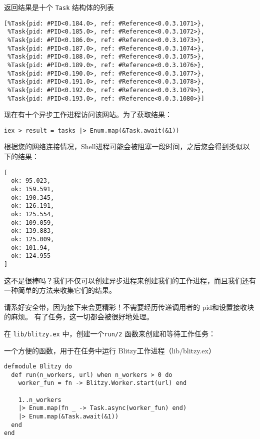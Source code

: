 返回结果是十个 \texttt{Task} 结构体的列表

\begin{code}{}
\begin{verbatim}
[%Task{pid: #PID<0.184.0>, ref: #Reference<0.0.3.1071>},
 %Task{pid: #PID<0.185.0>, ref: #Reference<0.0.3.1072>},
 %Task{pid: #PID<0.186.0>, ref: #Reference<0.0.3.1073>},
 %Task{pid: #PID<0.187.0>, ref: #Reference<0.0.3.1074>},
 %Task{pid: #PID<0.188.0>, ref: #Reference<0.0.3.1075>},
 %Task{pid: #PID<0.189.0>, ref: #Reference<0.0.3.1076>},
 %Task{pid: #PID<0.190.0>, ref: #Reference<0.0.3.1077>},
 %Task{pid: #PID<0.191.0>, ref: #Reference<0.0.3.1078>},
 %Task{pid: #PID<0.192.0>, ref: #Reference<0.0.3.1079>},
 %Task{pid: #PID<0.193.0>, ref: #Reference<0.0.3.1080>}]
\end{verbatim}
\end{code}

现在有十个异步工作进程访问该网站。为了获取结果：

\begin{code}{}\begin{verbatim}
iex > result = tasks |> Enum.map(&Task.await(&1))
\end{verbatim}
\end{code}

根据您的网络连接情况，Shell进程可能会被阻塞一段时间，之后您会得到类似以下的结果：

\begin{code}{}
\begin{verbatim}
[
  ok: 95.023,
  ok: 159.591,
  ok: 190.345,
  ok: 126.191,
  ok: 125.554,
  ok: 109.059,
  ok: 139.883,
  ok: 125.009,
  ok: 101.94,
  ok: 124.955
]
\end{verbatim}
\end{code}

这不是很棒吗？我们不仅可以创建异步进程来创建我们的工作进程，而且我们还有一种简单的方法来收集它们的结果。

请系好安全带，因为接下来会更精彩！不需要经历传递调用者的 pid和设置接收块的麻烦。
有了任务，这一切都会被很好地处理。

在 \texttt{lib/blitzy.ex} 中，创建一个\texttt{run/2} 函数来创建和等待工作任务：


\begin{code}{一个方便的函数，用于在任务中运行 Blitzy工作进程（lib/blitzy.ex）}

\begin{verbatim}
defmodule Blitzy do
  def run(n_workers, url) when n_workers > 0 do
    worker_fun = fn -> Blitzy.Worker.start(url) end

    1..n_workers
    |> Enum.map(fn _ -> Task.async(worker_fun) end)
    |> Enum.map(&Task.await(&1))
  end
end
\end{verbatim}
\end{code}

